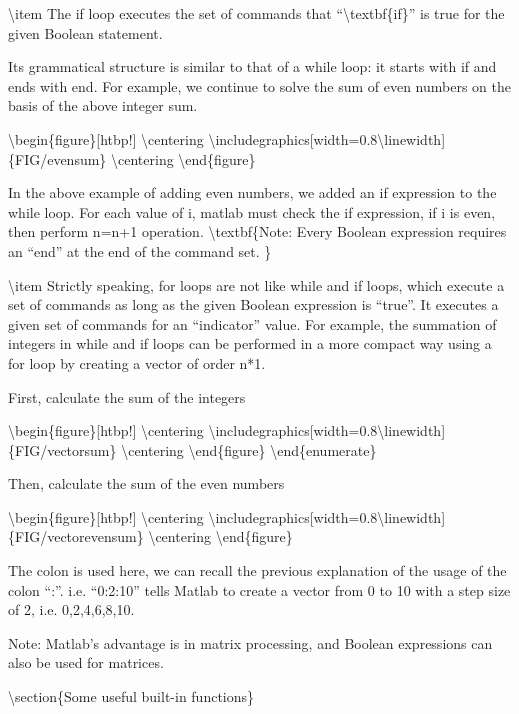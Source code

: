 \documentclass[10pt,math=newtx,citestyle=gb7714-2015,bibstyle=gb7714-2015]{elegantbook}
\begin{document}
	\textbackslash{}item The if loop executes the set of commands that ``\textbackslash{}textbf\{if\}'' is true for the given Boolean statement.
	
	Its grammatical structure is similar to that of a while loop: it starts with if and ends with end. For example, we continue to solve the sum of even numbers on the basis of the above integer sum.
	
	\textbackslash{}begin\{figure\}[htbp!]
	\textbackslash{}centering
	\textbackslash{}includegraphics[width=0.8\textbackslash{}linewidth]\{FIG/evensum\}
	\textbackslash{}centering
	\textbackslash{}end\{figure\}
	
	In the above example of adding even numbers, we added an if expression to the while loop. For each value of i, matlab must check the if expression, if i is even, then perform n=n+1 operation. \textbackslash{}textbf\{Note: Every Boolean expression requires an ``end'' at the end of the command set. \}
	
	\textbackslash{}item Strictly speaking, for loops are not like while and if loops, which execute a set of commands as long as the given Boolean expression is ``true''. It executes a given set of commands for an ``indicator'' value. For example, the summation of integers in while and if loops can be performed in a more compact way using a for loop by creating a vector of order n*1.
	
	First, calculate the sum of the integers
	
	\textbackslash{}begin\{figure\}[htbp!]
	\textbackslash{}centering
	\textbackslash{}includegraphics[width=0.8\textbackslash{}linewidth]\{FIG/vectorsum\}
	\textbackslash{}centering
	\textbackslash{}end\{figure\}
	\textbackslash{}end\{enumerate\}
	
	Then, calculate the sum of the even numbers
	
	\textbackslash{}begin\{figure\}[htbp!]
	\textbackslash{}centering
	\textbackslash{}includegraphics[width=0.8\textbackslash{}linewidth]\{FIG/vectorevensum\}
	\textbackslash{}centering
	\textbackslash{}end\{figure\}
	
	The colon is used here, we can recall the previous explanation of the usage of the colon ``:''. i.e. ``0:2:10'' tells Matlab to create a vector from 0 to 10 with a step size of 2, i.e. 0,2,4,6,8,10.
	
	Note: Matlab's advantage is in matrix processing, and Boolean expressions can also be used for matrices.
	
	\textbackslash{}section\{Some useful built-in functions\}
	
\end{document}
